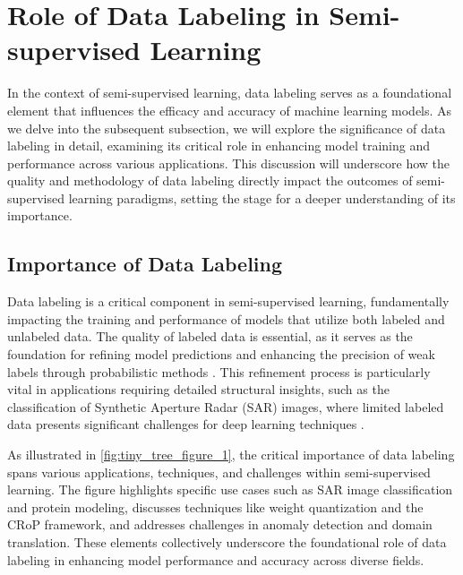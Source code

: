 












\section{Role of Data Labeling in Semi-supervised Learning} \label{sec:Role of Data Labeling in Semi-supervised Learning}

In the context of semi-supervised learning, data labeling serves as a foundational element that influences the efficacy and accuracy of machine learning models. As we delve into the subsequent subsection, we will explore the significance of data labeling in detail, examining its critical role in enhancing model training and performance across various applications. This discussion will underscore how the quality and methodology of data labeling directly impact the outcomes of semi-supervised learning paradigms, setting the stage for a deeper understanding of its importance. 






\subsection{Importance of Data Labeling} \label{subsec:Importance of Data Labeling}

Data labeling is a critical component in semi-supervised learning, fundamentally impacting the training and performance of models that utilize both labeled and unlabeled data. The quality of labeled data is essential, as it serves as the foundation for refining model predictions and enhancing the precision of weak labels through probabilistic methods \cite{ling2021bayesiannetworkstructurelearning}. This refinement process is particularly vital in applications requiring detailed structural insights, such as the classification of Synthetic Aperture Radar (SAR) images, where limited labeled data presents significant challenges for deep learning techniques \cite{huang2022physicallyexplainablecnnsar}. 

As illustrated in \autoref{fig:tiny_tree_figure_1}, the critical importance of data labeling spans various applications, techniques, and challenges within semi-supervised learning. The figure highlights specific use cases such as SAR image classification and protein modeling, discusses techniques like weight quantization and the CRoP framework, and addresses challenges in anomaly detection and domain translation. These elements collectively underscore the foundational role of data labeling in enhancing model performance and accuracy across diverse fields.

